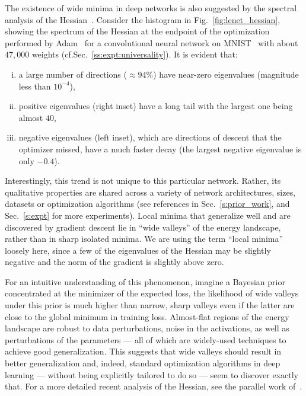 \documentclass[10pt]{article}
\newcommand\red[1]{{\color{red}#1}}
\newcommand{\pc}[2]{{\color{ForestGreen}#1}\marginpar{\tiny\noindent{\raggedright{\color{Sienna}[PC]}\color{Sienna}{#2} \par}}}
\begin{document}
\red{The existence of wide minima in deep networks is also suggested by the spectral analysis of the Hessian~\citep{sagun2016singularity}.} Consider the histogram in Fig.~\ref{fig:lenet_hessian}, showing the spectrum of the Hessian at the endpoint of the optimization performed by Adam~\citep{kingma2014adam} for a convolutional neural network on MNIST~\citep{lecun1998gradient} with about $47,000$ weights (cf.\@ Sec.~\ref{ss:expt:universality}). It is evident that:
\begin{enumerate}[(i)]
\item a large number of directions ($\approx 94\%$) have near-zero eigenvalues (magnitude less than $10^{-4}$),
\item positive eigenvalues (right inset) have a long tail with the largest one being almost $40$,
\item negative eigenvalues (left inset), which are directions of descent that the optimizer missed, have a much faster decay (the largest negative eigenvalue is only $-0.4$).
\end{enumerate}
Interestingly, this trend is not unique to this particular network. Rather, its qualitative properties are shared across a variety of network architectures, sizes, datasets or optimization algorithms (see references in Sec.~\ref{s:prior_work}, and Sec.~\ref{s:expt} for more experiments). \pc{Local minima}{We are using the term ``local minima'' loosely here, since a few of the eigenvalues of the Hessian may be slightly negative} that generalize well and are discovered by gradient descent lie in ``wide valleys'' of the energy landscape, rather than in sharp isolated minima. 
\red{We are using the term ``local minima'' loosely here, since a few of the eigenvalues of the Hessian may be slightly negative and the norm of the gradient is slightly above zero.}

For an intuitive understanding of this phenomenon, imagine a Bayesian prior concentrated at the minimizer of the expected loss, the likelihood of wide valleys under this prior is much higher than narrow, sharp valleys even if the latter are close to the global minimum in training loss.
Almost-flat regions of the energy landscape are robust to data perturbations, noise in the activations, as well as perturbations of the parameters --- all of which are widely-used techniques to achieve good generalization. This suggests that wide valleys should result in better generalization and, indeed, standard optimization algorithms in deep learning --- without being explicitly tailored to do so --- seem to discover exactly that. \red{For a more detailed recent
analysis of the Hessian, see the parallel work of~\citet{sagun2016singularity}.}
\end{document}
